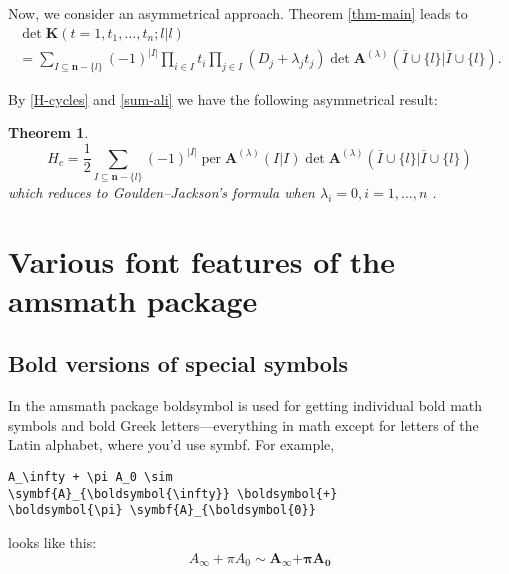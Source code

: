 \documentclass{article}
\newcommand{\ntt}{\normalfont\ttfamily}
\newcommand{\cn}[1]{{\protect\ntt\bslash#1}}
\newcommand{\pkg}[1]{{\protect\ntt#1}}
\newtheorem{thm}{Theorem}[section]
\theoremstyle{definition}
\theoremstyle{remark}
\DeclareMathOperator{\per}{per}
\newcommand{\envert}[1]{\left\lvert#1\right\rvert}
\let\abs=\envert
\begin{document}
Now, we consider an asymmetrical approach. Theorem \ref{thm-main} leads to
\begin{multline}
\det\symbf{K}(t=1,t_1,\dots,t_n;l |l )\\
=\sum_{I\subseteq\symbf{n}-\{l \}}
(-1)^{\abs{I}}\prod_{i\in I}t_i\prod_{j\in I}
(D_j+\lambda_jt_j)\det\symbf{A}^{(\lambda)}
(\overline I\cup\{l \}|\overline I\cup\{l \}).
\end{multline}

By \eqref{H-cycles} and \eqref{sum-ali} we have the following asymmetrical
result:
\begin{thm}\label{thm-asym}
\begin{equation}
H_c=\frac12\sum_{I\subseteq\symbf{n}-\{l \}}
(-1)^{\abs{I}}\per\symbf{A}^{(\lambda)}(I|I)\det
\symbf{A}^{(\lambda)}
(\overline I\cup\{l \}|\overline I\cup\{l \})
\end{equation}
which reduces to Goulden--Jackson's formula when $\lambda_i=0,i=1,\dots,n$
\cite{mami:matrixth}.
\end{thm}

\section{Various font features of the \pkg{amsmath} package}
\label{s:font}
\subsection{Bold versions of special symbols}

In the \pkg{amsmath} package \cn{boldsymbol} is used for getting
individual bold math symbols and bold Greek letters---everything in
math except for letters of the Latin alphabet,
where you'd use \cn{symbf}.  For example,
\begin{verbatim}
A_\infty + \pi A_0 \sim
\symbf{A}_{\boldsymbol{\infty}} \boldsymbol{+}
\boldsymbol{\pi} \symbf{A}_{\boldsymbol{0}}
\end{verbatim}
looks like this:
\[A_\infty + \pi A_0 \sim \symbf{A}_{\boldsymbol{\infty}}
\boldsymbol{+} \boldsymbol{\pi} \symbf{A}_{\boldsymbol{0}}\]
\end{document}
